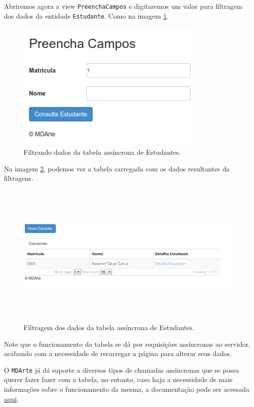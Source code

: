 Abriremos agora a view \texttt{PreenchaCampos} e digitaremos um valor para
filtragem dos dados da entidade \texttt{Estudante}. Como na imagem
\ref{preencha_campos_tabela_async_simples}.
\begin{figure}[H]
	\centering
	\includegraphics[width=260pt,height=180pt]{files/imgs/tutorial-mdarte-0031.png}
	\caption{Filtrando dados da tabela assíncrona de Estudantes.}
	\label{preencha_campos_tabela_async_simples}
\end{figure}

Na imagem \ref{resultado_consulta_tabela_async_simples}, podemos ver a tabela
carregada com os dados resultantes da filtragens. 
\begin{figure}[H]
	\centering
	\includegraphics[width=460pt,height=200pt]{files/imgs/tutorial-mdarte-0032.png}
	\caption{Filtragem dos dados da tabela assíncrona de Estudantes.}
	\label{resultado_consulta_tabela_async_simples}
\end{figure}

Note que o funcionamento da tabela se dá por requisições assíncronas
ao servidor, acabando com a necessidade de recarregar a página para alterar seus
dados. 

O \texttt{MDArte} já dá suporte a diversos tipos de chamadas assíncronas que se
possa querer fazer fazer com a tabela, no entanto, caso haja a necessidade de
mais informações sobre o funcionamento da mesma, a documentação pode ser
acessada \href{http://www.jtable.org/Home/Documents}{aqui}.

